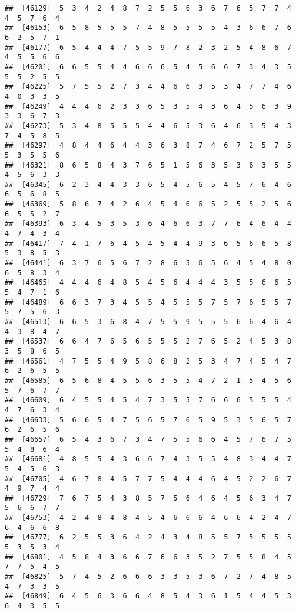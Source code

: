 \documentclass[
]{book}
\begin{document}
\begin{verbatim}
##  [46129]  5  3  4  2  4  8  7  2  5  5  6  3  6  7  6  5  7  7  4  4  5  7  6  4
##  [46153]  6  5  8  5  5  5  7  4  8  5  5  5  5  4  3  6  6  7  6  6  2  5  7  1
##  [46177]  6  5  4  4  4  7  5  5  9  7  8  2  3  2  5  4  8  6  7  4  5  5  6  6
##  [46201]  6  6  5  5  4  4  6  6  6  5  4  5  6  6  7  3  4  3  5  5  5  2  5  5
##  [46225]  5  7  5  5  2  7  3  4  4  6  6  3  5  3  4  7  7  4  6  4  0  3  3  5
##  [46249]  4  4  4  6  2  3  3  6  5  3  5  4  3  6  4  5  6  3  9  3  3  6  7  3
##  [46273]  5  3  4  8  5  5  5  4  4  6  5  3  6  4  6  3  5  4  3  7  4  5  8  5
##  [46297]  4  8  4  4  6  4  4  3  6  3  8  7  4  6  7  2  5  7  5  5  3  5  5  6
##  [46321]  8  6  5  8  4  3  7  6  5  1  5  6  3  5  3  6  3  5  5  4  5  6  3  3
##  [46345]  6  2  3  4  4  3  3  6  5  4  5  6  5  4  5  7  6  4  6  6  5  6  8  5
##  [46369]  5  8  6  7  4  2  6  4  5  4  6  6  5  2  5  5  2  5  6  6  5  5  2  7
##  [46393]  6  3  4  5  3  5  3  6  4  6  6  3  7  7  6  4  6  4  4  4  7  4  3  4
##  [46417]  7  4  1  7  6  4  5  4  5  4  4  9  3  6  5  6  6  5  8  5  3  8  5  3
##  [46441]  6  3  7  6  5  6  7  2  8  6  5  6  5  6  4  5  4  8  0  6  5  8  3  4
##  [46465]  4  4  4  6  4  8  5  4  5  6  4  4  4  3  5  5  6  6  5  5  4  7  1  6
##  [46489]  6  6  3  7  3  4  5  5  4  5  5  5  7  5  7  6  5  5  7  5  7  5  6  3
##  [46513]  6  6  5  3  6  8  4  7  5  5  9  5  5  5  6  6  4  6  4  4  3  8  4  7
##  [46537]  6  6  4  7  6  5  6  5  5  5  2  7  6  5  2  4  5  3  8  3  5  8  6  5
##  [46561]  4  7  5  5  4  9  5  8  6  8  2  5  3  4  7  4  5  4  7  6  2  6  5  5
##  [46585]  6  5  6  8  4  5  5  6  3  5  5  4  7  2  1  5  4  5  6  5  7  6  7  7
##  [46609]  6  4  5  5  4  5  4  7  3  5  5  7  6  6  6  5  5  5  4  4  7  6  3  4
##  [46633]  5  6  6  5  4  7  5  6  5  7  6  5  9  5  3  5  6  5  7  6  2  6  5  6
##  [46657]  6  5  4  3  6  7  3  4  7  5  5  6  6  4  5  7  6  7  5  5  4  8  6  4
##  [46681]  4  8  5  5  4  3  6  6  7  4  3  5  5  4  8  3  4  4  7  5  4  5  6  3
##  [46705]  4  6  7  8  4  5  7  7  5  4  4  4  6  4  5  2  2  6  7  4  9  7  4  4
##  [46729]  7  6  7  5  4  3  8  5  7  5  6  4  6  4  5  6  3  4  7  5  6  6  7  7
##  [46753]  4  2  4  8  4  8  4  5  4  6  6  6  4  6  6  4  2  4  7  6  4  6  6  8
##  [46777]  6  2  5  5  3  6  4  2  4  3  4  8  5  5  7  5  5  5  5  5  3  5  3  4
##  [46801]  4  5  8  4  3  6  6  7  6  6  3  5  2  7  5  5  8  4  5  7  7  5  4  5
##  [46825]  5  7  4  5  2  6  6  6  3  3  5  3  6  7  2  7  4  8  5  4  7  3  3  5
##  [46849]  6  4  5  6  3  6  6  4  8  5  4  3  6  1  5  4  4  5  3  6  4  3  5  5

\end{verbatim}
\end{document}
